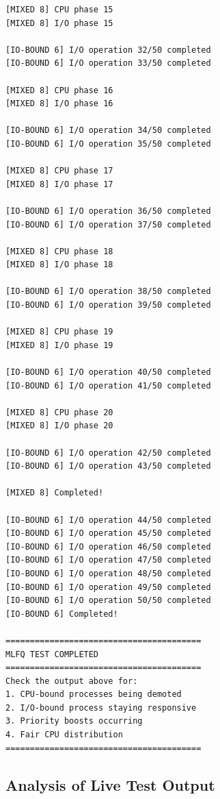 \documentclass[a4paper,12pt]{report}
\begin{document}
\begin{tcolorbox}[colback=black!5, colframe=green!60, title=\textbf{Live XV6 MLFQ Test Execution}]
\begin{lstlisting}[basicstyle=\ttfamily\tiny, breaklines=true, backgroundcolor=\color{black!5}]
[MIXED 8] CPU phase 15
[MIXED 8] I/O phase 15

[IO-BOUND 6] I/O operation 32/50 completed
[IO-BOUND 6] I/O operation 33/50 completed

[MIXED 8] CPU phase 16
[MIXED 8] I/O phase 16

[IO-BOUND 6] I/O operation 34/50 completed
[IO-BOUND 6] I/O operation 35/50 completed

[MIXED 8] CPU phase 17
[MIXED 8] I/O phase 17

[IO-BOUND 6] I/O operation 36/50 completed
[IO-BOUND 6] I/O operation 37/50 completed

[MIXED 8] CPU phase 18
[MIXED 8] I/O phase 18

[IO-BOUND 6] I/O operation 38/50 completed
[IO-BOUND 6] I/O operation 39/50 completed

[MIXED 8] CPU phase 19
[MIXED 8] I/O phase 19

[IO-BOUND 6] I/O operation 40/50 completed
[IO-BOUND 6] I/O operation 41/50 completed

[MIXED 8] CPU phase 20
[MIXED 8] I/O phase 20

[IO-BOUND 6] I/O operation 42/50 completed
[IO-BOUND 6] I/O operation 43/50 completed

[MIXED 8] Completed!

[IO-BOUND 6] I/O operation 44/50 completed
[IO-BOUND 6] I/O operation 45/50 completed
[IO-BOUND 6] I/O operation 46/50 completed
[IO-BOUND 6] I/O operation 47/50 completed
[IO-BOUND 6] I/O operation 48/50 completed
[IO-BOUND 6] I/O operation 49/50 completed
[IO-BOUND 6] I/O operation 50/50 completed
[IO-BOUND 6] Completed!

========================================
MLFQ TEST COMPLETED
========================================
Check the output above for:
1. CPU-bound processes being demoted
2. I/O-bound process staying responsive  
3. Priority boosts occurring
4. Fair CPU distribution
========================================
\end{lstlisting}
\end{tcolorbox}

\subsection{Analysis of Live Test Output}
\end{document}
